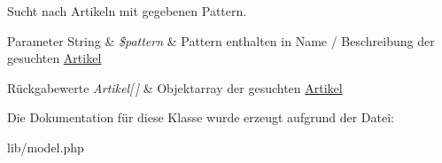 \-Sucht nach \-Artikeln mit gegebenen \-Pattern. 


\begin{DoxyParams}[1]{\-Parameter}
\-String & {\em \$pattern} & \-Pattern enthalten in \-Name / \-Beschreibung der gesuchten \hyperlink{classArtikel}{\-Artikel} \\
\hline
\end{DoxyParams}

\begin{DoxyRetVals}{\-Rückgabewerte}
{\em \-Artikel\mbox{[}$\,$\mbox{]}} & \-Objektarray der gesuchten \hyperlink{classArtikel}{\-Artikel} \\
\hline
\end{DoxyRetVals}


\-Die \-Dokumentation für diese \-Klasse wurde erzeugt aufgrund der \-Datei\-:\begin{DoxyCompactItemize}
\item 
lib/model.\-php\end{DoxyCompactItemize}
